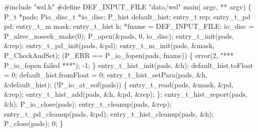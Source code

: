 \begin{centercode}
#include "wsl.h"
#define DEF\_INPUT\_FILE  "data/wsl"
\mbox{}
 main( argc, ** argv) \{
  P\_t                   *pads;
  Pio\_disc\_t           *io\_disc;
  P\_hist                default_hist;
  entry\_t               rep;
  entry\_t\_pd           pd;
  entry\_t\_m            mask;
  entry\_t\_hist         h;
                *fname = DEF\_INPUT\_FILE;
\mbox{}
  io\_disc = P\_nlrec\_noseek\_make(0);
  P\_open(&pads, 0, io\_disc);
\mbox{}
  entry\_t\_init(pads, &rep);
  entry\_t\_pd\_init(pads, &pd);
  entry\_t\_m\_init(pads, &mask, P\_CheckAndSet);
\mbox{}
   (P\_ERR == P\_io\_fopen(pads, fname)) \{
    error(2, "*** P\_io\_fopen failed ***");
     -1;
  \}
\mbox{}
  entry\_t\_hist\_init(pads, &h);
  default\_hist.toFloat = 0;
  default\_hist.fromFloat = 0;
  entry\_t\_hist\_setPara(pads, &h, &default_hist);
   (!P\_io\_at\_eof(pads)) \{
    entry\_t\_read(pads, &mask, &pd, &rep);
    entry\_t\_hist\_add(pads, &h, &pd, &rep);
  \};
  entry\_t\_hist\_report(pads, &h);
\mbox{}
  P\_io\_close(pads);
  entry\_t\_cleanup(pads, &rep);
  entry\_t\_pd\_cleanup(pads, &pd);
  entry\_t\_hist\_cleanup(pads, &h);
  P\_close(pads);
   0;
\}
\end{centercode}

